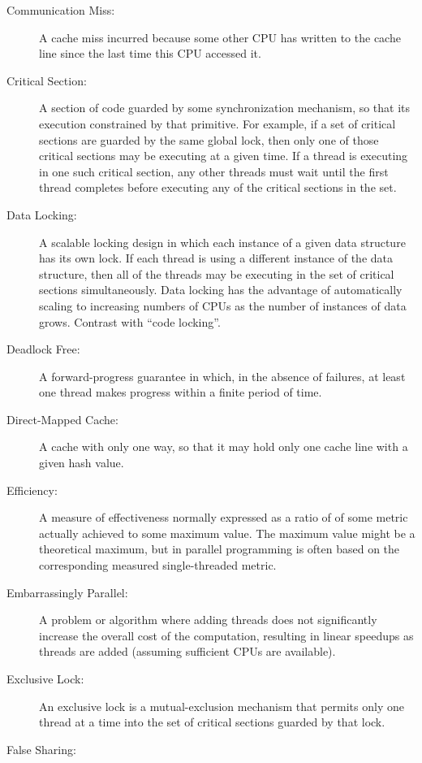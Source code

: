 \begin{description}
\item[Communication Miss:]
	A cache miss incurred because some other CPU has written to
	the cache line since the last time this CPU accessed it.
\item[Critical Section:]
	A section of code guarded by some synchronization mechanism,
	so that its execution constrained by that primitive.
	For example, if a set of critical sections are guarded by
	the same global lock, then only one of those critical sections
	may be executing at a given time.
	If a thread is executing in one such critical section,
	any other threads must wait until the first thread completes
	before executing any of the critical sections in the set.
\item[Data Locking:]
	A scalable locking design in which each instance of a given
	data structure has its own lock.
	If each thread is using a different instance of the
	data structure, then all of the threads may be executing in
	the set of critical sections simultaneously.
	Data locking has the advantage of automatically scaling to
	increasing numbers of CPUs as the number of instances of
	data grows.
	Contrast with ``code locking''.
\item[Deadlock Free:]
	A forward-progress guarantee in which, in the absence of
	failures, at least one thread makes progress within a finite
	period of time.
\item[Direct-Mapped Cache:]
	A cache with only one way, so that it may hold only one cache
	line with a given hash value.
\item[Efficiency:]
	A measure of effectiveness normally expressed as a ratio of
	of some metric actually achieved to some maximum value.
	The maximum value might be a theoretical maximum, but in
	parallel programming is often based on the corresponding
	measured single-threaded metric.
\item[Embarrassingly Parallel:]
	A problem or algorithm where adding threads does not significantly
	increase the overall cost of the computation, resulting in
	linear speedups as threads are added (assuming sufficient
	CPUs are available).
\item[Exclusive Lock:]
	An exclusive lock is a mutual-exclusion mechanism that
	permits only one thread at a time into the
	set of critical sections guarded by that lock.
\item[False Sharing:]

\end{description}
